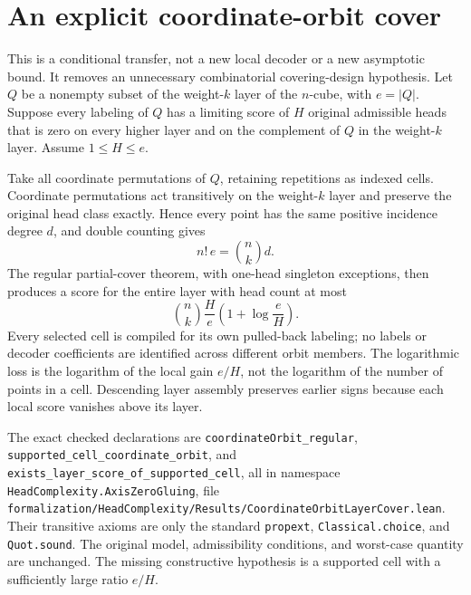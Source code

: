 \section{An explicit coordinate-orbit cover}
This is a conditional transfer, not a new local decoder or a new asymptotic
bound. It removes an unnecessary combinatorial covering-design hypothesis.
Let $Q$ be a nonempty subset of the weight-$k$ layer of the $n$-cube, with
$e=|Q|$. Suppose every labeling of $Q$ has a limiting score of $H$ original
admissible heads that is zero on every higher layer and on the complement
of $Q$ in the weight-$k$ layer. Assume $1\le H\le e$.

Take all coordinate permutations of $Q$, retaining repetitions as indexed
cells. Coordinate permutations act transitively on the weight-$k$ layer and
preserve the original head class exactly. Hence every point has the same
positive incidence degree $d$, and double counting gives
\[
 n!\,e={n\choose k}d.
\]
The regular partial-cover theorem, with one-head singleton exceptions,
then produces a score for the entire layer with head count at most
\[
 {n\choose k}\frac{H}{e}\left(1+\log\frac eH\right).
\]
Every selected cell is compiled for its own pulled-back labeling; no labels
or decoder coefficients are identified across different orbit members.
The logarithmic loss is the logarithm of the local gain $e/H$, not the
logarithm of the number of points in a cell. Descending layer assembly
preserves earlier signs because each local score vanishes above its layer.

The exact checked declarations are
\texttt{coordinateOrbit\_regular},
\texttt{supported\_cell\_coordinate\_orbit}, and
\texttt{exists\_layer\_score\_of\_supported\_cell}, all in namespace
\texttt{HeadComplexity.AxisZeroGluing}, file
\texttt{formalization/HeadComplexity/Results/CoordinateOrbitLayerCover.lean}.
Their transitive axioms are only the standard
\texttt{propext}, \texttt{Classical.choice}, and \texttt{Quot.sound}.
The original model, admissibility conditions, and worst-case quantity are
unchanged. The missing constructive hypothesis is a supported cell with a
sufficiently large ratio $e/H$.
